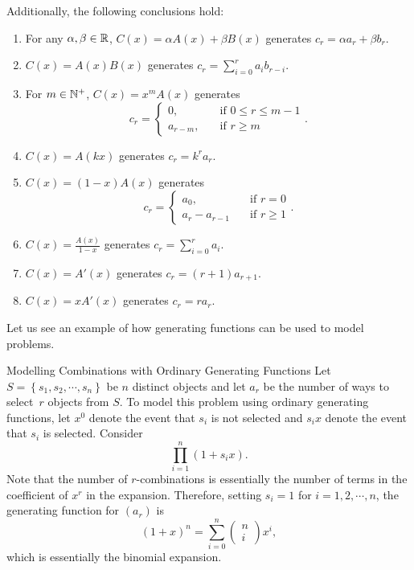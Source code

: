 \documentclass[math]{amznotes}
\theoremstyle{remark}
\begin{document}
Additionally, the following conclusions hold:
\begin{enumerate}
    \item For any $\alpha, \beta \in \mathbb{R}$, $C(x) = \alpha A(x) + \beta B(x)$ generates $c_r = \alpha a_r + \beta b_r$.
    \item $C(x) = A(x)B(x)$ generates $c_r = \sum_{i = 0}^{r}a_ib_{r - i}$.
    \item For $m \in \mathbb{N}^+$, $C(x) = x^mA(x)$ generates 
    \begin{equation*}
        c_r = \begin{cases}
            0, & \quad\textrm{if } 0 \leq r \leq m - 1 \\
            a_{r - m}, & \quad\textrm{if } r \geq m
        \end{cases}.
    \end{equation*}
    \item $C(x) = A(kx)$ generates $c_r = k^ra_r$.
    \item $C(x) = (1 - x)A(x)$ generates
    \begin{equation*}
        c_r = \begin{cases}
            a_0, & \quad\textrm{if } r = 0 \\
            a_r - a_{r - 1} & \quad\textrm{if } r \geq 1
        \end{cases}.
    \end{equation*}
    \item $C(x) = \frac{A(x)}{1 - x}$ generates $c_r = \sum_{i = 0}^{r}a_i$.
    \item $C(x) = A'(x)$ generates $c_r = (r + 1)a_{r + 1}$.
    \item $C(x) = xA'(x)$ generates $c_r = ra_r$.
\end{enumerate}
Let us see an example of how generating functions can be used to model problems.
\begin{tecbox}{\small Modelling Combinations with Ordinary Generating Functions}{}
    Let $S = \left\{s_1, s_2, \cdots, s_n\right\}$ be $n$ distinct objects and let $a_r$ be the number of ways to select~$r$ objects from $S$. To model this problem using ordinary generating functions, let $x^0$ denote the event that $s_i$ is not selected and $s_ix$ denote the event that $s_i$ is selected. Consider
    \begin{equation*}
        \prod_{i = 1}^{n}(1 + s_ix).
    \end{equation*}
    Note that the number of $r$-combinations is essentially the number of terms in the coefficient of $x^r$ in the expansion. Therefore, setting $s_i = 1$ for $i = 1, 2, \cdots, n$, the generating function for $(a_r)$ is
    \begin{equation*}
        (1 + x)^n = \sum_{i = 0}^{n}\begin{pmatrix}
            n \\
            i
        \end{pmatrix}x^i,
    \end{equation*}
    which is essentially the binomial expansion.
\end{tecbox}
\end{document}
